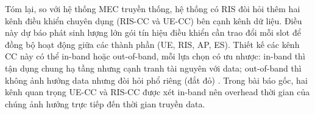 Tóm lại, so với hệ thống MEC truyền thống, hệ thống có RIS đòi hỏi thêm hai kênh điều khiển chuyên dụng (RIS-CC và UE-CC) bên cạnh kênh dữ liệu. Điều này dự báo phát sinh lượng lớn gói tín hiệu điều khiển cần trao đổi mỗi slot để đồng bộ hoạt động giữa các thành phần (UE, RIS, AP, ES). Thiết kế các kênh CC này có thể in-band hoặc out-of-band, mỗi lựa chọn có ưu nhược: in-band thì tận dụng chung hạ tầng nhưng cạnh tranh tài nguyên với data; out-of-band thì không ảnh hưởng data nhưng đòi hỏi phổ riêng (đắt đỏ)
\cite{mec}
. Trong bài báo gốc, hai kênh quan trọng UE-CC và RIS-CC được xét in-band nên overhead thời gian của chúng ảnh hưởng trực tiếp đến thời gian truyền data.